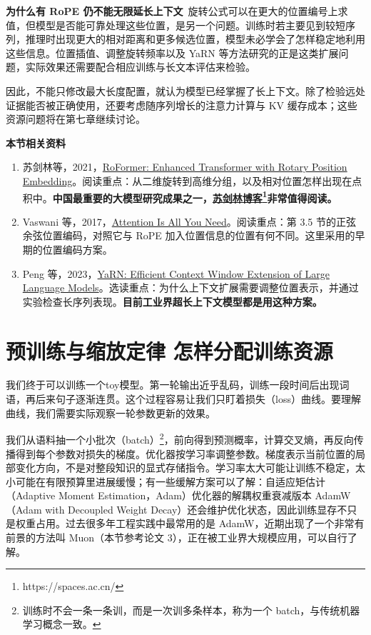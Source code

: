 \textbf{为什么有 RoPE 仍不能无限延长上下文}~旋转公式可以在更大的位置编号上求值，但模型是否能可靠处理这些位置，是另一个问题。训练时若主要见到较短序列，推理时出现更大的相对距离和更多候选位置，模型未必学会了怎样稳定地利用这些信息。位置插值、调整旋转频率以及 YaRN 等方法研究的正是这类扩展问题，实际效果还需要配合相应训练与长文本评估来检验。

因此，不能只修改最大长度配置，就认为模型已经掌握了长上下文。除了检验远处证据能否被正确使用，还要考虑随序列增长的注意力计算与 KV 缓存成本；这些资源问题将在第七章继续讨论。


\begin{samepage}
\textbf{本节相关资料}
\begin{enumerate}
    \item 苏剑林等，2021，\href{https://arxiv.org/abs/2104.09864}{RoFormer: Enhanced Transformer with Rotary Position Embedding}。阅读重点：从二维旋转到高维分组，以及相对位置怎样出现在点积中。\textbf{中国最重要的大模型研究成果之一，\href{https://spaces.ac.cn/}{苏剑林博客}\footnote{https://spaces.ac.cn/}非常值得阅读。}
    \item Vaswani 等，2017，\href{https://arxiv.org/abs/1706.03762}{Attention Is All You Need}。阅读重点：第 3.5 节的正弦余弦位置编码，对照它与 RoPE 加入位置信息的位置有何不同。这里采用的早期的位置编码方案。
    \item Peng 等，2023，\href{https://arxiv.org/abs/2309.00071}{YaRN: Efficient Context Window Extension of Large Language Models}。选读重点：为什么上下文扩展需要调整位置表示，并通过实验检查长序列表现。\textbf{目前工业界超长上下文模型都是用这种方案。}
\end{enumerate}
\end{samepage}

\section{预训练与缩放定律 怎样分配训练资源}\label{预训练与缩放定律 怎样分配训练资源}

我们终于可以训练一个toy模型。第一轮输出近乎乱码，训练一段时间后出现词语，再后来句子逐渐连贯。这个过程容易让我们只盯着损失（loss）曲线。要理解曲线，我们需要实际观察一轮参数更新的效果。

我们从语料抽一个小批次（batch）\footnote{训练时不会一条一条训，而是一次训多条样本，称为一个 batch，与传统机器学习概念一致。}，前向得到预测概率，计算交叉熵，再反向传播得到每个参数对损失的梯度。优化器按学习率调整参数。梯度表示当前位置的局部变化方向，不是对整段知识的显式存储指令。学习率太大可能让训练不稳定，太小可能在有限预算里进展缓慢；有一些缓解方案可以了解：自适应矩估计（Adaptive Moment Estimation，Adam）优化器的解耦权重衰减版本 AdamW（Adam with Decoupled Weight Decay）还会维护优化状态，因此训练显存不只是权重占用。过去很多年工程实践中最常用的是 AdamW，近期出现了一个非常有前景的方法叫 Muon（本节参考论文 3），正在被工业界大规模应用，可以自行了解。

